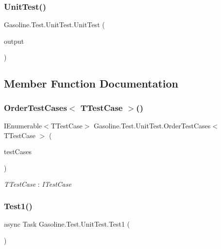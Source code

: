 \subsubsection{\texorpdfstring{UnitTest()}{UnitTest()}}
{\footnotesize\ttfamily Gasoline.\+Test.\+Unit\+Test.\+Unit\+Test (\begin{DoxyParamCaption}\item[{I\+Test\+Output\+Helper}]{output }\end{DoxyParamCaption})}



\subsection{Member Function Documentation}
\mbox{\label{class_gasoline_1_1_test_1_1_unit_test_a35942fc791655bbcc42672f9729fb393}} 
\subsubsection{\texorpdfstring{OrderTestCases$<$ TTestCase $>$()}{OrderTestCases< TTestCase >()}}
{\footnotesize\ttfamily I\+Enumerable$<$T\+Test\+Case$>$ Gasoline.\+Test.\+Unit\+Test.\+Order\+Test\+Cases$<$ T\+Test\+Case $>$ (\begin{DoxyParamCaption}\item[{I\+Enumerable$<$ T\+Test\+Case $>$}]{test\+Cases }\end{DoxyParamCaption})}

\begin{Desc}
\item[Type Constraints]\begin{description}
\item[{\em T\+Test\+Case} : {\em I\+Test\+Case}]\end{description}
\end{Desc}
\mbox{\label{class_gasoline_1_1_test_1_1_unit_test_ac62b1e58dd412651cd4776ff6ea5b564}} 
\subsubsection{\texorpdfstring{Test1()}{Test1()}}
{\footnotesize\ttfamily async Task Gasoline.\+Test.\+Unit\+Test.\+Test1 (\begin{DoxyParamCaption}{ }\end{DoxyParamCaption})}

